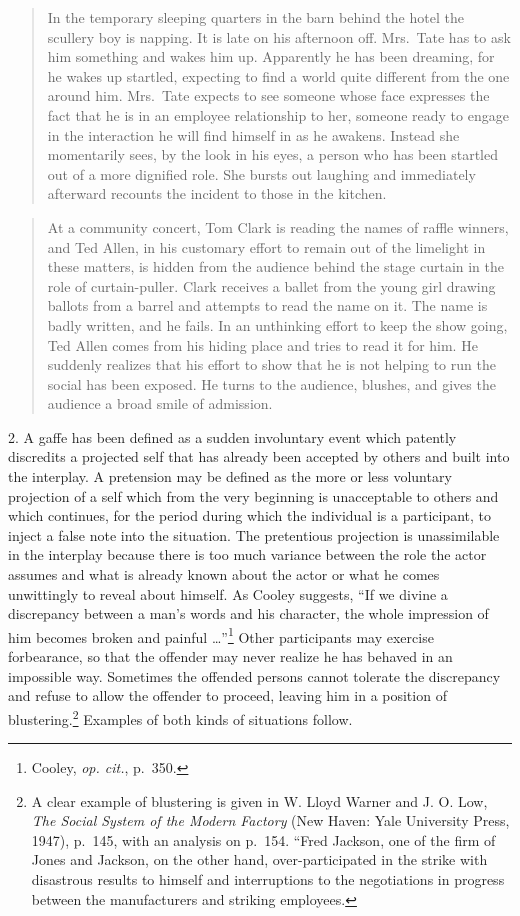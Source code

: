 \documentclass[twoside,symmetric,nobib,justified]{tufte-book}
\begin{document}
\begin{quote}
In the temporary sleeping quarters in the barn behind the hotel the
scullery boy is napping. It is late on his afternoon off. Mrs.~Tate has
to ask him something and wakes him up. Apparently he has been dreaming,
for he wakes up startled, expecting to find a world quite different from
the one around him. Mrs.~Tate expects to see someone whose face
expresses the fact that he is in an employee relationship to her,
someone ready to engage in the interaction he will find himself in as he
awakens. Instead she momentarily sees, by the look in his eyes, a person
who has been startled out of a more dignified role. She bursts out
laughing and immediately afterward recounts the incident to those in the
kitchen.
\end{quote}

\begin{quote}
At a community concert, Tom Clark is reading the names of raffle
winners, and Ted Allen, in his customary effort to remain out of the
limelight in these matters, is hidden from the audience behind the stage
curtain in the role of curtain-puller. Clark receives a ballet from the
young girl drawing ballots from a barrel and attempts to read the name
on it. The name is badly written, and he fails. In an unthinking effort
to keep the show going, Ted Allen comes from his hiding place and tries
to read it for him. He suddenly realizes that his effort to show that he
is not helping to run the social has been exposed. He turns to the
audience, blushes, and gives the audience a broad smile of admission.
\end{quote}

2. A gaffe has been defined as a sudden involuntary event which patently
discredits a projected self that has already been accepted by others and
built into the interplay. A pretension may be defined as the more or
less voluntary projection of a self which from the very beginning is
unacceptable to others and which continues, for the period during which
the individual is a participant, to inject a false note into the
situation. The pretentious projection is unassimilable in the interplay
because there is too much variance between the role the actor assumes
and what is already known about the actor or what he comes unwittingly
to reveal about himself. As Cooley suggests, ``If we divine a
discrepancy between a man's words and his character, the whole
impression of him becomes broken and painful \ldots''\footnote{Cooley,
  \emph{op. cit.}, p.~350.} Other participants may exercise forbearance,
so that the offender may never realize he has behaved in an impossible
way. Sometimes the offended persons cannot tolerate the discrepancy and
refuse to allow the offender to proceed, leaving him in a position of
blustering.\footnote{A clear example of blustering is given in W. Lloyd
  Warner and J. O. Low, \emph{The Social System of the Modern Factory}
  (New Haven: Yale University Press, 1947), p.~145, with an analysis on
  p.~154. ``Fred Jackson, one of the firm of Jones and Jackson, on the
  other hand, over-participated in the strike with disastrous results to
  himself and interruptions to the negotiations in progress between the
  manufacturers and striking employees.} Examples of
both kinds of situations follow.
\end{document}
